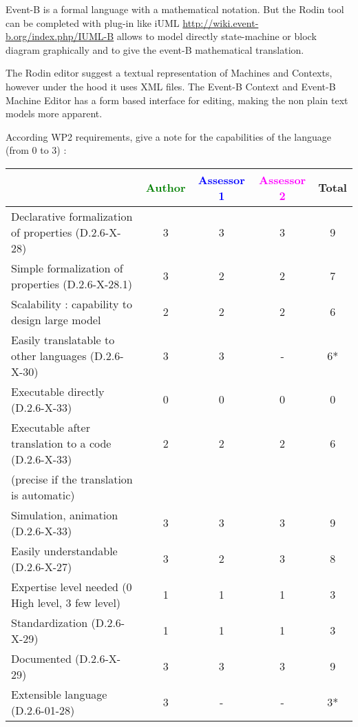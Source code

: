 \begin{author_comment}
Event-B  is a formal language with a mathematical notation. But the Rodin tool can be completed with plug-in like iUML \url{http://wiki.event-b.org/index.php/IUML-B} allows to model directly state-machine or block diagram  graphically and to  give the event-B mathematical translation.
\end{author_comment}

\begin{assessor2}
  The Rodin editor suggest a textual representation of Machines and
  Contexts, however under the hood it uses XML files. The Event-B
  Context and Event-B Machine Editor has a form based interface for
  editing, making the non plain text models more apparent.
\end{assessor2}

According WP2 requirements, give a note for the capabilities of the language (from 0 to 3) :

\begin{tabular}{|l | c | c | c | c|}
\hline
& \textcolor{green}{Author} & \textcolor{blue}{Assessor 1} & \textcolor{magenta}{Assessor 2} & Total \\
\hline
Declarative formalization of properties (D.2.6-X-28) & 3 & 3 & 3 & 9 \\
\hline
Simple formalization of properties (D.2.6-X-28.1) & 3 & 2 & 2 & 7 \\
\hline
Scalability : capability to design large model & 2 & 2 & 2 & 6 \\
\hline
Easily translatable to other languages (D.2.6-X-30) & 3 & 3 & - & 6* \\
\hline
Executable directly (D.2.6-X-33) & 0 & 0 & 0 & 0 \\
\hline
Executable after translation to a code (D.2.6-X-33) & 2 & 2 & 2 & 6 \\
(precise if the translation is automatic) & & & & \\
\hline
Simulation, animation (D.2.6-X-33) & 3 & 3 & 3 & 9 \\
\hline
Easily understandable (D.2.6-X-27) & 3 & 2 & 3 & 8 \\
\hline
Expertise level needed (0 High level, 3 few level) & 1 & 1 & 1 & 3 \\
\hline
Standardization (D.2.6-X-29) & 1 & 1 & 1 & 3\\
\hline
Documented (D.2.6-X-29) & 3 & 3 & 3 & 9\\
\hline
Extensible language (D.2.6-01-28) & 3 & - & - & 3* \\
\hline
\end{tabular}

